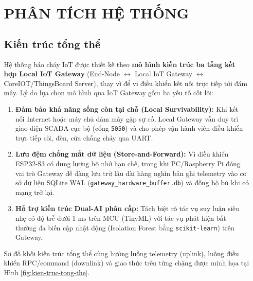 
\section{PHÂN TÍCH HỆ THỐNG}
\label{sec:phan-tich-he-thong}

\subsection{Kiến trúc tổng thể}
\label{subsec:kien-truc-tong-the}

Hệ thống báo cháy IoT được thiết kế theo \textbf{mô hình kiến trúc ba tầng kết hợp Local IoT Gateway} (End-Node $\leftrightarrow$ Local IoT Gateway $\leftrightarrow$ CoreIOT/ThingsBoard Server), thay vì để vi điều khiển kết nối trực tiếp tới đám mây. Lý do lựa chọn mô hình qua IoT Gateway gồm ba yếu tố cốt lõi:
\begin{enumerate}[leftmargin=*, itemsep=2pt]
  \item \textbf{Đảm bảo khả năng sống còn tại chỗ (Local Survivability):} Khi kết nối Internet hoặc máy chủ đám mây gặp sự cố, Local Gateway vẫn duy trì giao diện SCADA cục bộ (cổng \texttt{5050}) và cho phép vận hành viên điều khiển trực tiếp còi, đèn, cửa chống cháy qua UART.
  \item \textbf{Lưu đệm chống mất dữ liệu (Store-and-Forward):} Vi điều khiển ESP32-S3 có dung lượng bộ nhớ hạn chế, trong khi PC/Raspberry Pi đóng vai trò Gateway dễ dàng lưu trữ lâu dài hàng nghìn bản ghi telemetry vào cơ sở dữ liệu SQLite WAL (\texttt{gateway\_hardware\_buffer.db}) và đồng bộ bù khi có mạng trở lại.
  \item \textbf{Hỗ trợ kiến trúc Dual-AI phân cấp:} Tách biệt rõ tác vụ suy luận siêu nhẹ có độ trễ dưới $1\text{ ms}$ trên MCU (TinyML) với tác vụ phát hiện bất thường đa biến cập nhật động (Isolation Forest bằng \texttt{scikit-learn}) trên Gateway.
\end{enumerate}

Sơ đồ khối kiến trúc tổng thể cùng hướng luồng telemetry (uplink), luồng điều khiển RPC/command (downlink) và giao thức trên từng chặng được minh họa tại Hình \ref{fig:kien-truc-tong-the}.

